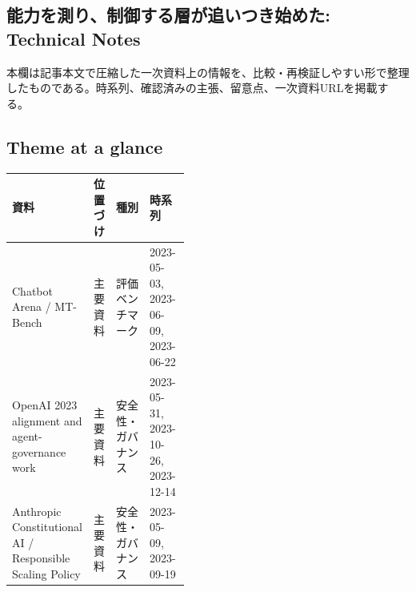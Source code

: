 \subsection*{能力を測り、制御する層が追いつき始めた: Technical Notes}
本欄は記事本文で圧縮した一次資料上の情報を、比較・再検証しやすい形で整理したものである。時系列、確認済みの主張、留意点、一次資料URLを掲載する。
\smallskip
{}\par
\medskip
\subsection*{Theme at a glance}
\begin{center}
\footnotesize
\begin{tabularx}{\linewidth}{@{}p{0.20\linewidth}p{0.10\linewidth}p{0.14\linewidth}X@{}}
\toprule
資料 & 位置づけ & 種別 & 時系列 \\
\midrule
Chatbot Arena / MT-Bench & 主要資料 & 評価ベンチマーク & 2023-05-03, 2023-06-09, 2023-06-22 \\
OpenAI 2023 alignment and agent-governance work & 主要資料 & 安全性・ガバナンス & 2023-05-31, 2023-10-26, 2023-12-14 \\
Anthropic Constitutional AI / Responsible Scaling Policy & 主要資料 & 安全性・ガバナンス & 2023-05-09, 2023-09-19 \\
\bottomrule
\end{tabularx}
\end{center}
\normalsize

